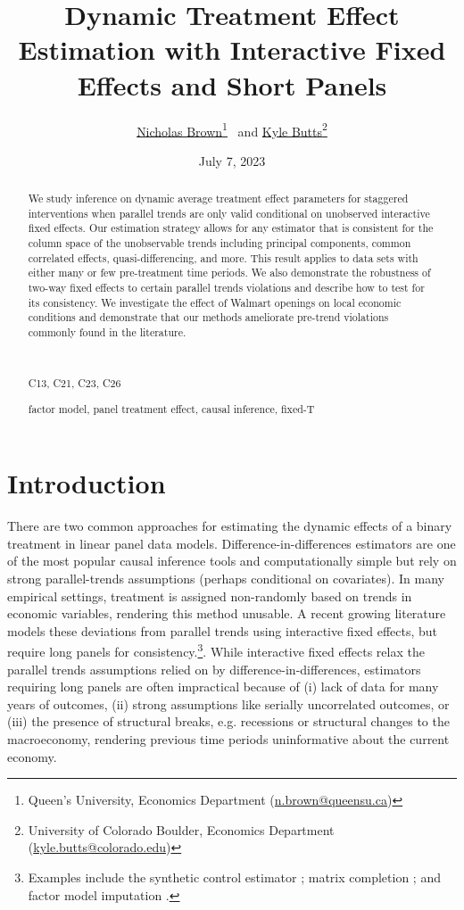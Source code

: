 \documentclass[12pt]{article}
\title{%
Dynamic Treatment Effect Estimation with Interactive Fixed Effects and Short Panels
}
\author{%
\href{https://sites.google.com/msu.edu/nicholasbrown}{Nicholas Brown}\thanks{Queen's University, Economics Department (\href{mailto:n.brown@queensu.ca}{n.brown@queensu.ca})}
\ and 
\href{https://kylebutts.com/}{Kyle Butts}\thanks{University of Colorado Boulder, Economics Department (\href{mailto:kyle.butts@colorado.edu}{kyle.butts@colorado.edu})}}
\date{July 7, 2023}
\begin{document}
\maketitle

\begin{abstract}
  We study inference on dynamic average treatment effect parameters for staggered interventions when parallel trends are only valid conditional on unobserved interactive fixed effects. Our estimation strategy allows for any estimator that is consistent for the column space of the unobservable trends including principal components, common correlated effects, quasi-differencing, and more. This result applies to data sets with either many or few pre-treatment time periods. We also demonstrate the robustness of two-way fixed effects to certain parallel trends violations and describe how to test for its consistency. We investigate the effect of Walmart openings on local economic conditions and demonstrate that our methods ameliorate pre-trend violations commonly found in the literature.
  
  
  \par~\par\noindent
   C13, C21, C23, C26
  \par
   factor model, panel treatment effect, causal inference, fixed-T
  \par\vspace{-2.5mm}
\end{abstract}

\newpage


\section{Introduction}

There are two common approaches for estimating the dynamic effects of a binary treatment in linear panel data models. Difference-in-differences estimators are one of the most popular causal inference tools and computationally simple but rely on strong parallel-trends assumptions (perhaps conditional on covariates). In many empirical settings, treatment is assigned non-randomly based on trends in economic variables, rendering this method unusable. A recent growing literature models these deviations from parallel trends using interactive fixed effects, but require long panels for consistency.\footnote{Examples include the synthetic control estimator \citep{Abadie_2021}; matrix completion \citep{Athey_et_al_2021}; and factor model imputation \citep{Xu_2017,Gobillon_Magnac_2016}.}. While interactive fixed effects relax the parallel trends assumptions relied on by difference-in-differences, estimators requiring long panels are often impractical because of (i) lack of data for many years of outcomes, (ii) strong assumptions like serially uncorrelated outcomes, or (iii) the presence of structural breaks, e.g. recessions or structural changes to the macroeconomy, rendering previous time periods uninformative about the current economy. 
\end{document}
